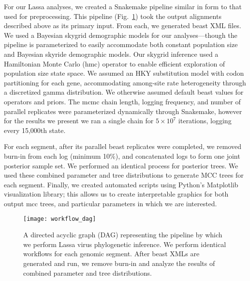 For our Lassa analyses, we created a Snakemake pipeline similar in form to that used for preprocessing.
This pipeline (Fig.~\ref{fig:workflow_dag}) took the output alignments described above as its primary input.
From each, we generated \gls{beast} XML files.
We used a Bayesian skygrid demographic models for our analyses---though the pipeline is parameterized to easily accommodate both constant population size and Bayesian skyride\cite{minin2008smooth} demographic models.
Our skygrid inference used a Hamiltonian Monte Carlo (\gls{hmc}) operator to enable efficient exploration of population size state space\cite{baele2020hamiltonian}.
We assumed an HKY substitution model with codon partitioning for each gene, accommodating among-site rate heterogeneity through a discretized gamma distribution.
We otherwise assumed default \gls{beast} values for operators and priors.
The \gls{mcmc} chain length, logging frequency, and number of parallel replicates were parameterized dynamically through Snakemake, however for the results we present we ran a single chain for $5\times10^7$ iterations, logging every 15,000th state.

For each segment, after its parallel \gls{beast} replicates were completed, we removed burn-in from each log (minimum 10\%), and concatenated logs to form one joint posterior sample set.
We performed an identical process for posterior trees. %
We used these combined parameter and tree distributions to generate MCC trees for each segment.
Finally, we created automated scripts using Python's Matplotlib\cite{hunter2007matplotlib} visualization library; this allows us to create interpretable graphics for both output \gls{mcc} trees, and particular parameters in which we are interested.

\begin{figure}[ht]
  \centering
  \medskip
  \texttt{[image: workflow\_dag]}
  \caption[Lassa phylogenetics pipeline]{A directed acyclic graph (DAG) representing the pipeline by which we perform Lassa virus phylogenetic inference. We perform identical workflows for each genomic segment. After \gls{beast} XMLs are generated and run, we remove burn-in and analyze the results of combined parameter and tree distributions.}
  \label{fig:workflow_dag}
\end{figure}

